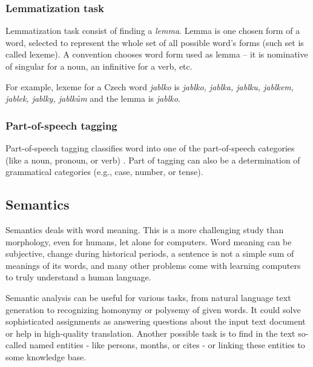 \par
\subsubsection{Lemmatization task}
Lemmatization task consist of finding a \textit{lemma}. Lemma is one chosen form of a word, selected to represent the whole set of all possible word's forms (such set is called lexeme).  A convention chooses word form used as lemma -- it is nominative of singular for a noun, an infinitive for a verb, etc.
\par
For example, lexeme for a Czech word \textit{jablko} is \textit{jablko, jablka, jablku,  jablkem, jablek, jablky, jablkům} and the lemma is \textit{jablko}.

\subsubsection{Part-of-speech tagging} 
Part-of-speech tagging classifies word into one of the part-of-speech categories (like a noun, pronoun, or verb) \citep{Hladka}. Part of tagging can also be a determination of grammatical categories (e.g., case, number, or tense). 

\subsection{Semantics}
Semantics deals with word meaning. This is a more challenging study than morphology, even for humans, let alone for computers. Word meaning can be subjective, change during historical periods, a sentence is not a simple sum of meanings of its words, and many other problems come with learning computers to truly understand a human language. 
\par
Semantic analysis can be useful for various tasks, from natural language text generation to recognizing homonymy or polysemy of given words. It could solve sophisticated assignments as answering questions about the input text document or help in high-quality translation. Another possible task is to find in the text so-called named entities - like persons, months, or cites - or linking these entities to some knowledge base. 

